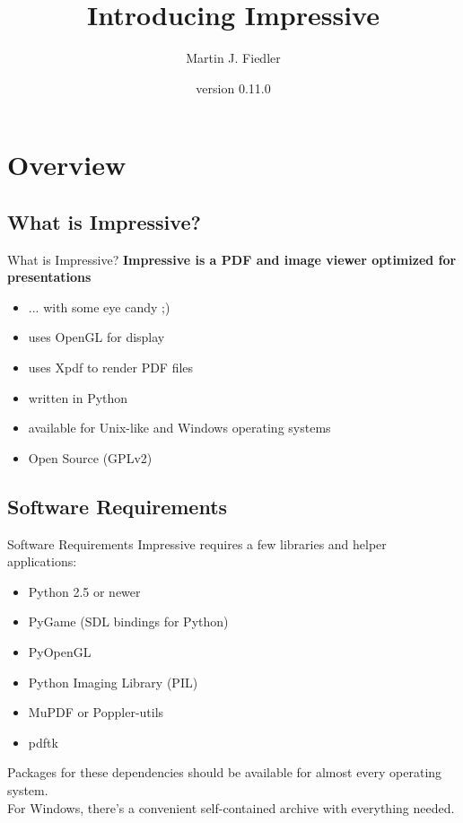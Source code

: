 \documentclass[bigger,hyperref={colorlinks=true,linkcolor=white,urlcolor=blue}]{beamer}
\title{Introducing Impressive}
\author{Martin J. Fiedler}
\date{version 0.11.0}
\begin{document}
\maketitle


\section{Overview}

\subsection{What is Impressive?}
\begin{frame}{What is Impressive?}
    \large
    \textbf{Impressive is a PDF and image viewer optimized for presentations}
    \normalsize
    \begin{itemize}
        \item ... with some eye candy ;)
        \item uses OpenGL for display
        \item uses Xpdf to render PDF files
        \item written in Python
        \item available for Unix-like and Windows operating systems
        \item Open Source (GPLv2)
    \end{itemize}
\end{frame}

\subsection{Software Requirements}
\begin{frame}{Software Requirements}
    Impressive requires a few libraries and helper applications:
    \begin{itemize}
        \item Python 2.5 or newer
        \item PyGame (SDL bindings for Python)
        \item PyOpenGL
        \item Python Imaging Library (PIL)
        \item MuPDF or Poppler-utils
        \item pdftk
    \end{itemize}
    Packages for these dependencies should be available for almost every
    operating system. \\
    For Windows, there's a convenient self-contained archive with
    everything needed.
\end{frame}
\end{document}
